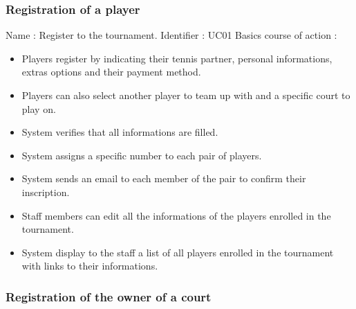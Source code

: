 \subsubsection{Registration of a player}

Name : Register to the tournament. \newline
Identifier : UC01 \newline
Basics course of action : \newline
\begin{itemize}
	\item Players register by indicating their tennis partner, personal informations, extras 	options and their payment method.
	\item Players can also select another player to team up with and a specific court to play on.
	\item System verifies that all informations are filled.
	\item System assigns a specific number to each pair of players.
	\item System sends an email to each member of the pair to confirm their inscription.
	\item Staff members can edit all the informations of the players enrolled in the tournament.
	\item System display to the staff a list of all players enrolled in the tournament with links to their informations.
\end{itemize}

\subsubsection{Registration of the owner of a court}

